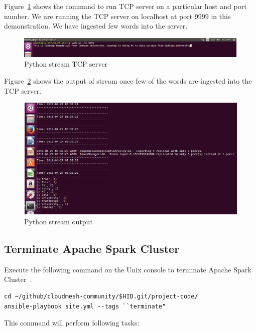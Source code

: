 Figure~\ref{f:python-stream-tcp-server.png} shows the command to run TCP server on a particular host and port number. We are running the TCP server on localhost at port 9999 in this demonstration. We have ingested few words into the server.

\begin{figure}[!ht]
	\centering\includegraphics[width=\columnwidth]{images/pythonstreamtcpserver.png}
	\caption{Python stream TCP server}\label{f:python-stream-tcp-server.png}
\end{figure}

Figure~\ref{f:python_stream_prog_run_output.png} shows the output of stream once few of the words are ingested into the TCP server.

\begin{figure}[!ht]
	\centering\includegraphics[width=\columnwidth]{images/pythonstreamprogrunoutput.png}
	\caption{Python stream output}\label{f:python_stream_prog_run_output.png}
\end{figure}

\subsection{Terminate Apache Spark Cluster}

Execute the following command on the Unix console to terminate Apache
Spark Cluster~\cite{hid-sp18-511-www-spark}.

\begin{verbatim}
cd ~/github/cloudmesh-community/$HID.git/project-code/
ansible-playbook site.yml --tags ``terminate"
\end{verbatim}

This command will perform following tasks:

